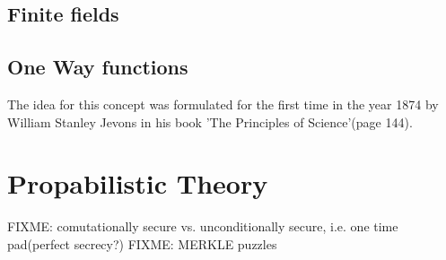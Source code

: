 \subsection{Finite fields}

\subsection{One Way functions}

The idea for this concept was formulated for the first time in the year 1874 by William Stanley Jevons in his book
'The Principles of Science'(page 144).

\section{Propabilistic Theory}



FIXME: comutationally secure vs. unconditionally secure, i.e. one time pad(perfect secrecy?)
FIXME: MERKLE puzzles
